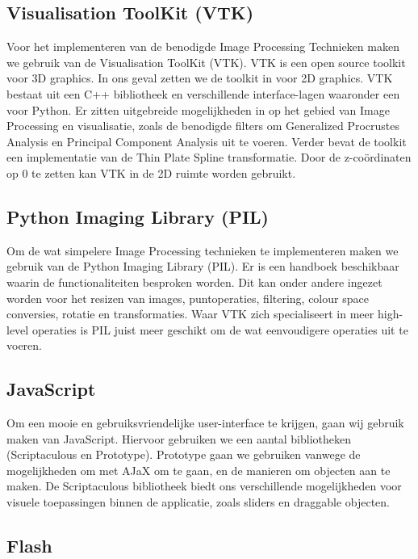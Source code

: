 \subsection{Visualisation ToolKit (VTK)}
Voor het implementeren van de benodigde Image Processing Technieken maken we gebruik van de Visualisation ToolKit (VTK)\cite{vtk}. 
VTK is een open source toolkit voor 3D graphics. 
In ons geval zetten we de toolkit in voor 2D graphics. 
VTK bestaat uit een C++ bibliotheek en verschillende interface-lagen waaronder een voor Python.\cite{vtk2} 
Er zitten uitgebreide mogelijkheden in op het gebied van Image Processing en visualisatie, zoals de benodigde filters om Generalized Procrustes Analysis en Principal Component Analysis uit te voeren. 
Verder bevat de toolkit een implementatie van de Thin Plate Spline transformatie. 
Door de z-co\"{o}rdinaten op 0 te zetten kan VTK in de 2D ruimte worden gebruikt. 

\subsection{Python Imaging Library (PIL)}
Om de wat simpelere Image Processing technieken te implementeren maken we gebruik van de Python Imaging Library (PIL)\cite{pil}. 
Er is een handboek beschikbaar waarin de functionaliteiten besproken worden.\cite{pilhandbook} 
Dit kan onder andere ingezet worden voor het resizen van images, puntoperaties, filtering, colour space conversies, rotatie en transformaties. Waar VTK zich specialiseert in meer high-level operaties is PIL juist meer geschikt om de wat eenvoudigere operaties uit te voeren. 

\subsection{JavaScript}
Om een mooie en gebruiksvriendelijke user-interface te krijgen, gaan wij gebruik maken van JavaScript.
Hiervoor gebruiken we een aantal bibliotheken (Scriptaculous\cite{scriptaculous} en Prototype\cite{prototype}).
Prototype gaan we gebruiken vanwege de mogelijkheden om met AJaX om te gaan, en de manieren om objecten aan te maken.
De Scriptaculous bibliotheek biedt ons verschillende mogelijkheden voor visuele toepassingen binnen de applicatie, zoals sliders en draggable objecten.

\subsection{Flash}
